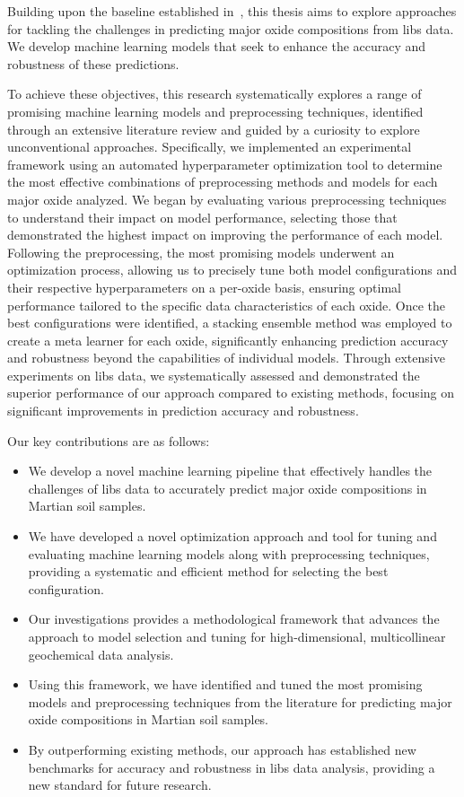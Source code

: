 Building upon the baseline established in~\citet{p9_paper}, this thesis aims to explore approaches for tackling the challenges in predicting major oxide compositions from \gls{libs} data. We develop machine learning models that seek to enhance the accuracy and robustness of these predictions.

To achieve these objectives, this research systematically explores a range of promising machine learning models and preprocessing techniques, identified through an extensive literature review and guided by a curiosity to explore unconventional approaches.
Specifically, we implemented an experimental framework using an automated hyperparameter optimization tool to determine the most effective combinations of preprocessing methods and models for each major oxide analyzed.
We began by evaluating various preprocessing techniques to understand their impact on model performance, selecting those that demonstrated the highest impact on improving the performance of each model.
Following the preprocessing, the most promising models underwent an optimization process, allowing us to precisely tune both model configurations and their respective hyperparameters on a per-oxide basis, ensuring optimal performance tailored to the specific data characteristics of each oxide.
Once the best configurations were identified, a stacking ensemble method was employed to create a meta learner for each oxide, significantly enhancing prediction accuracy and robustness beyond the capabilities of individual models.
Through extensive experiments on \gls{libs} data, we systematically assessed and demonstrated the superior performance of our approach compared to existing methods, focusing on significant improvements in prediction accuracy and robustness.

Our key contributions are as follows:
\begin{itemize}
    \item We develop a novel machine learning pipeline that effectively handles the challenges of \gls{libs} data to accurately predict major oxide compositions in Martian soil samples.
    \item We have developed a novel optimization approach and tool for tuning and evaluating machine learning models along with preprocessing techniques, providing a systematic and efficient method for selecting the best configuration.
    \item Our investigations provides a methodological framework that advances the approach to model selection and tuning for high-dimensional, multicollinear geochemical data analysis.
    \item Using this framework, we have identified and tuned the most promising models and preprocessing techniques from the literature for predicting major oxide compositions in Martian soil samples.
    \item By outperforming existing methods, our approach has established new benchmarks for accuracy and robustness in \gls{libs} data analysis, providing a new standard for future research.
\end{itemize}


